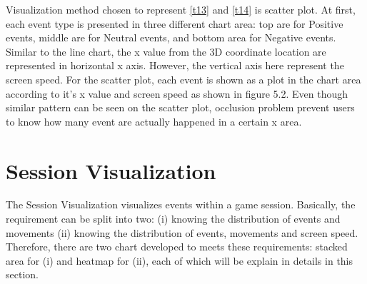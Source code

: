 Visualization method chosen to represent \ref{t13} and \ref{t14} is scatter plot. At first, each event type is presented in three different chart area: top are for Positive events, middle are for Neutral events, and bottom area for Negative events. Similar to the line chart, the x value from the 3D coordinate location are represented in horizontal x axis. However, the vertical axis here represent the screen speed. For the scatter plot, each event is shown as a plot in the chart area according to it's x value and screen speed as shown in figure 5.2. Even though similar pattern can be seen on the scatter plot, occlusion problem prevent users to know how many event are actually happened in a certain x area.

\section{Session Visualization}
The Session Visualization visualizes events within a game session. Basically, the requirement can be split into two: (i) knowing the distribution of events and movements (ii) knowing the distribution of events, movements and screen speed. Therefore, there are two chart developed to meets these requirements: stacked area for (i) and heatmap for (ii), each of which will be explain in details in this section.

